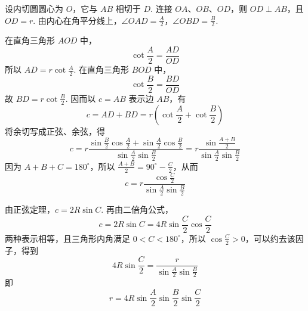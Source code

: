 \begin{solution}
设内切圆圆心为 \(O\)，它与 \(AB\) 相切于 \(D\). 连接 \(OA\)、\(OB\)、\(OD\)，则 \(OD\perp AB\)，且 \(OD=r\). 由内心在角平分线上，\(\angle OAD=\frac{A}{2}\)，\(\angle OBD=\frac{B}{2}\).

在直角三角形 \(AOD\) 中，
\[
\cot\frac{A}{2}=\frac{AD}{OD}
\]
所以 \(AD=r\cot\frac{A}{2}\). 在直角三角形 \(BOD\) 中，
\[
\cot\frac{B}{2}=\frac{BD}{OD}
\]
故 \(BD=r\cot\frac{B}{2}\). 因而以 \(c=AB\) 表示边 \(AB\)，有
\[
c=AD+BD=r\left(\cot\frac{A}{2}+\cot\frac{B}{2}\right)
\]
将余切写成正弦、余弦，得
\[
c=r\frac{\sin\frac{B}{2}\cos\frac{A}{2}+\sin\frac{A}{2}\cos\frac{B}{2}}{\sin\frac{A}{2}\sin\frac{B}{2}}=r\frac{\sin\frac{A+B}{2}}{\sin\frac{A}{2}\sin\frac{B}{2}}
\]
因为 \(A+B+C=180^\circ\)，所以 \(\frac{A+B}{2}=90^\circ-\frac{C}{2}\)，从而
\[
c=r\frac{\cos\frac{C}{2}}{\sin\frac{A}{2}\sin\frac{B}{2}}
\]

由正弦定理，\(c=2R\sin C\). 再由二倍角公式，
\[
c=2R\sin C=4R\sin\frac{C}{2}\cos\frac{C}{2}
\]
两种表示相等，且三角形内角满足 \(0<C<180^\circ\)，所以 \(\cos\frac{C}{2}>0\)，可以约去该因子，得到
\[
4R\sin\frac{C}{2}=\frac{r}{\sin\frac{A}{2}\sin\frac{B}{2}}
\]
即
\[
r=4R\sin\frac{A}{2}\sin\frac{B}{2}\sin\frac{C}{2}
\]
\end{solution}

